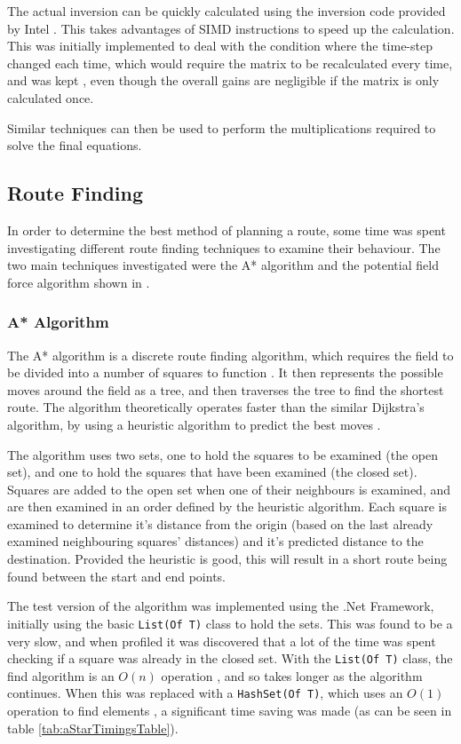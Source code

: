 \documentclass[10pt]{article}
\begin{document}
The actual inversion can be quickly calculated using the inversion code provided
by Intel \cite{intelMatrixInverse}.  This takes advantages of \ac{SIMD}
instructions to speed up the calculation.  This was initially implemented to
deal with the condition where the time-step changed each time, which would
require the matrix to be recalculated every time, and was kept , even though the
overall gains are negligible if the matrix is only calculated once.

Similar techniques can then be used to perform the multiplications required to
solve the final equations.

\subsection{Route Finding}
In order to determine the best method of planning a route, some time was spent
investigating different route finding techniques to examine their behaviour. 
The two main techniques investigated were the A* algorithm and the potential
field force algorithm shown in \cite{intelligentAlgorithmPathPlanning}.

\subsubsection{A* Algorithm}

The A* algorithm is a discrete route finding algorithm, which requires the field
to be divided into a number of squares to function \cite{aiModernApproach}.  It
then represents the possible moves around the field as a tree, and then
traverses the tree to find the shortest route.  The algorithm theoretically
operates faster than the similar Dijkstra's algorithm, by using a heuristic
algorithm to predict the best moves \cite{wikipediaAStar}.

The algorithm uses two sets, one to hold the squares to be examined (the open
set), and one to hold the squares that have been examined (the closed set).
Squares are added to the open set when one of their neighbours is examined, and
are then examined in an order defined by the heuristic algorithm.  Each square
is examined to determine it's distance from the origin (based on the last
already examined neighbouring squares' distances) and it's predicted distance to
the destination. Provided the heuristic is good, this will result in a short
route being found between the start and end points.

The test version of the algorithm was implemented using the .Net Framework,
initially using the basic \texttt{List(Of T)} class to hold the sets.  This was
found to be a very slow, and when profiled it was discovered that a lot of the
time was spent checking if a square was already in the closed set.  With the
\texttt{List(Of T)} class, the find algorithm is an $O(n)$ operation
\cite{msdnListOfT}, and so takes longer as the algorithm continues.  When this
was replaced with a \texttt{HashSet(Of T)}, which uses an $O(1)$ operation to
find elements \cite{msdnHashSetOfT}, a significant time saving was made (as can
be seen in table \ref{tab:aStarTimingsTable}).
\end{document}
